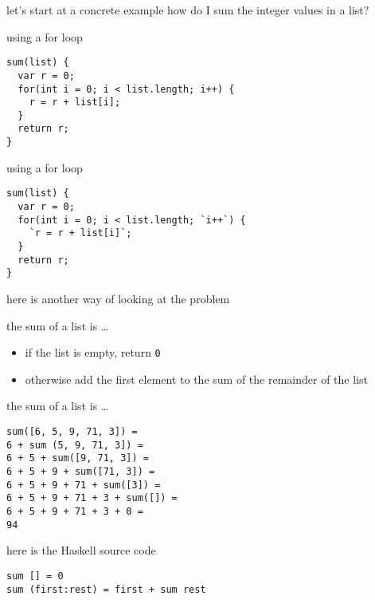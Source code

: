 \begin{frame}
\begin{block}{let's start at a concrete example}
how do I sum the integer values in a list?
\end{block}
\end{frame}

\begin{frame}[fragile]
\begin{block}{using a for loop}
\begin{lstlisting}[style=java]
sum(list) {
  var r = 0;
  for(int i = 0; i < list.length; i++) {
    r = r + list[i];
  }
  return r;
}
\end{lstlisting}
\end{block}
\end{frame}

\begin{frame}[fragile]
\begin{block}{using a for loop}
\begin{lstlisting}[style=java]
sum(list) {
  var r = 0;
  for(int i = 0; i < list.length; `i++`) {
    `r = r + list[i]`;
  }
  return r;
}
\end{lstlisting}
\end{block}
\end{frame}

\begin{frame}
\begin{center}
here is another way of looking at the problem
\end{center}
\end{frame}

\begin{frame}
\begin{block}{the sum of a list is \ldots}
\begin{itemize}
\item if the list is empty, return \lstinline{0}
\item otherwise add the first element to the sum of the remainder of the list
\end{itemize}
\end{block}
\end{frame}

\begin{frame}[fragile]
\begin{block}{the sum of a list is \ldots}
\begin{lstlisting}
sum([6, 5, 9, 71, 3]) =
6 + sum (5, 9, 71, 3]) =
6 + 5 + sum([9, 71, 3]) =
6 + 5 + 9 + sum([71, 3]) =
6 + 5 + 9 + 71 + sum([3]) =
6 + 5 + 9 + 71 + 3 + sum([]) =
6 + 5 + 9 + 71 + 3 + 0 =
94
\end{lstlisting}
\end{block}
\end{frame}

\begin{frame}[fragile]
\begin{block}{here is the Haskell source code}
\begin{lstlisting}[style=haskell]
sum [] = 0
sum (first:rest) = first + sum rest
\end{lstlisting}
\end{block}
\end{frame}
